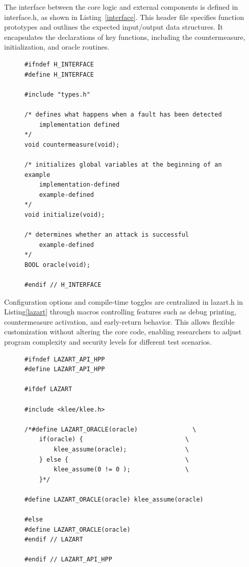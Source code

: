The interface between the core logic and external components is defined in interface.h, as shown in Listing~\ref{interface}. This header file specifies function prototypes and outlines the expected input/output data structures. It encapsulates the declarations of key functions, including the countermeasure, initialization, and oracle routines.
\begin{figure}
\begin{lstlisting}[caption={interface.h of VerifyPin function in benchmark V0}, label={interface}, basicstyle=\ttfamily\footnotesize]
#ifndef H_INTERFACE
#define H_INTERFACE

#include "types.h"

/* defines what happens when a fault has been detected
    implementation defined
*/
void countermeasure(void);

/* initializes global variables at the beginning of an example
    implementation-defined
    example-defined
*/
void initialize(void);

/* determines whether an attack is successful
    example-defined
*/
BOOL oracle(void);

#endif // H_INTERFACE
\end{lstlisting}
\end{figure}
Configuration options and compile-time toggles are centralized in lazart.h in Listing\ref{lazart} through macros controlling features such as debug printing, countermeasure activation, and early-return behavior. This allows flexible customization without altering the core code, enabling researchers to adjust program complexity and security levels for different test scenarios.
\begin{figure}
\begin{lstlisting}[caption={lazart.c of VerifyPin function in benchmark V0}, label={lazart}, basicstyle=\ttfamily\footnotesize]
#ifndef LAZART_API_HPP
#define LAZART_API_HPP

#ifdef LAZART

#include <klee/klee.h>

/*#define LAZART_ORACLE(oracle)               \
    if(oracle) {                            \
        klee_assume(oracle);                \
    } else {                                \
        klee_assume(0 != 0 );               \
    }*/

#define LAZART_ORACLE(oracle) klee_assume(oracle)

#else
#define LAZART_ORACLE(oracle)
#endif // LAZART

#endif // LAZART_API_HPP
\end{lstlisting}
\end{figure}

